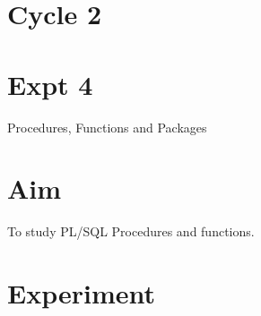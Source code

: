 \documentclass[13pt,oneside]{book}
\begin{document}
\section*{Cycle 2}
\section*{Expt 4}
\begin{center}
    \Large{Procedures, Functions and Packages}
\end{center}

\section*{Aim}
\large To study PL/SQL Procedures and functions.

\section*{Experiment}
\end{document}
